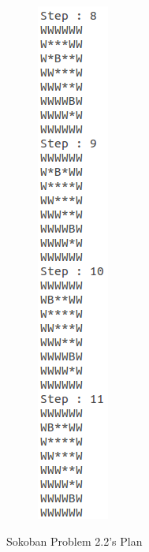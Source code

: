 \documentclass[10pt, letter]{article}
\begin{document}
\begin{figure} [h!]
\begin{subfigure}{.3\textwidth}
  \includegraphics[scale = 0.35]{images/sokoban2-ans3}
\end{subfigure}%
\caption{Sokoban Problem 2.2's Plan}
\label{sokoans2}
\end{figure}
\end{document}
